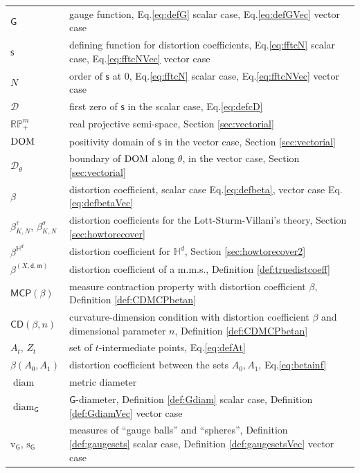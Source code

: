 \documentclass[11pt,a4paper]{article}
\theoremstyle{plain}
\theoremstyle{definition}
\theoremstyle{remark}
\numberwithin{equation}{section}
\newcommand{\RP}{\mathbb{RP}} %
\renewcommand{\H}{\mathbb{H}}
\newcommand{\DOM}{{\rm{DOM}}}
\newcommand{\CD}{\mathsf{CD}}
\newcommand{\MCP}{\mathsf{MCP}}
\newcommand{\cD}{\mathcal{D}}
\newcommand{\sfs}{\mathsf{s}}
\newcommand{\rv}{\mathrm{v}}
\newcommand{\rs}{\mathrm{s}}
\DeclareMathOperator{\diam}{\mathrm{diam}}
\newcommand{\mm}{\mathfrak m}
\newcommand{\sfd}{\mathsf d}
\newcommand{\sfG}{\mathsf G}
\begin{document}
\begin{xltabular}{\textwidth}{p{0.22\textwidth} X}
$\sfG$ \dotfill & gauge function, Eq.\@ \eqref{eq:defG} scalar case, Eq.\@ \eqref{eq:defGVec} vector case\\
$\sfs$ \dotfill & defining function for distortion coefficients, Eq.\@ \eqref{eq:fftcN} scalar case, Eq.\@ \eqref{eq:fftcNVec} vector case \\
$N$ \dotfill & order of $\sfs$ at 0, Eq.\@ \eqref{eq:fftcN} scalar case, Eq.\@ \eqref{eq:fftcNVec} vector case \\
$\cD$ \dotfill &  first zero of $\sfs$ in the scalar case, Eq.\@ \eqref{eq:defcD} \\
$\RP^m_+$ \dotfill & real projective semi-space, Section \ref{sec:vectorial} \\
$\DOM$ \dotfill & positivity domain of $\sfs$ in the vector case, Section \ref{sec:vectorial} \\
$\cD_\theta$ \dotfill & boundary of $\DOM$ along $\theta$, in the vector case, Section \ref{sec:vectorial} \\
$\beta$ \dotfill & distortion coefficient,  scalar case Eq.\@ \eqref{eq:defbeta}, vector case Eq.\@ \eqref{eq:defbetaVec} \\
$\beta^{\tau}_{K,N}$, $\beta^\sigma_{K,N}$ \dotfill & distortion coefficients for the Lott-Sturm-Villani's theory, Section \ref{sec:howtorecover} \\
$\beta^{\H^d}$ \dotfill & distortion coefficient for $\mathbb{H}^d$, Section \ref{sec:howtorecover2} \\
$\beta^{(X,\sfd,\mm)}$ \dotfill & distortion coefficient of a m.m.s., Definition \ref{def:truedistcoeff} \\
$\MCP(\beta)$\dotfill & measure contraction property with distortion coefficient $\beta$, Definition \ref{def:CDMCPbetan} \\
$\CD(\beta,n)$\dotfill & curvature-dimension condition with distortion coefficient $\beta$ and dimensional parameter $n$, Definition \ref{def:CDMCPbetan} \\
$A_t, \, Z_t$\dotfill & set of $t$-intermediate points, Eq.\@ \eqref{eq:defAt} \\
$\beta(A_0, A_1)$\dotfill & distortion coefficient between the sets $A_0, A_1$, Eq.\@ \eqref{eq:betainf} \\
$\diam$ \dotfill & metric diameter \\
$\diam_\sfG$ \dotfill & $\sfG$-diameter, Definition \ref{def:Gdiam} scalar case, Definition \ref{def:GdiamVec} vector case \\
$\rv_{\sfG}$, $\rs_{\sfG}$ \dotfill & measures of ``gauge balls'' and ``spheres'', Definition \ref{def:gaugesets} scalar case, Definition \ref{def:gaugesetsVec} vector case \\

\end{xltabular}
\end{document}
